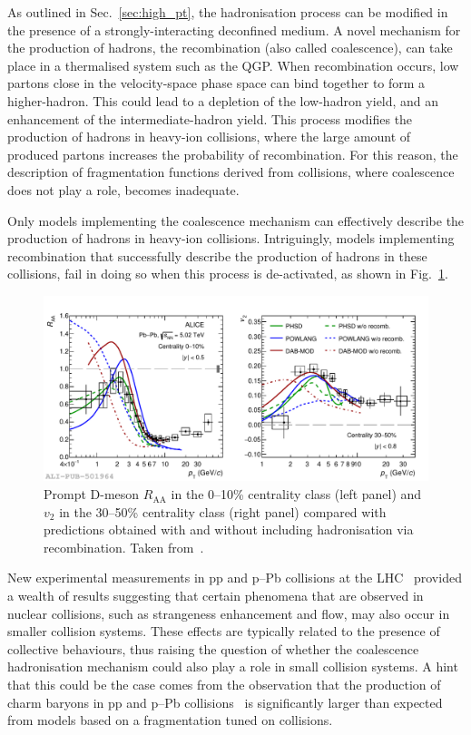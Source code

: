 As outlined in Sec.~\ref{sec:high_pt}, the hadronisation process can be modified in the presence of a strongly-interacting deconfined medium. A novel mechanism for the production of hadrons, the recombination (also called coalescence), can take place in a thermalised system such as the QGP. When recombination occurs, low \pt partons close in the velocity-space phase space can bind together to form a higher-\pt hadron. This could lead to a depletion of the low-\pt hadron yield, and an enhancement of the intermediate-\pt hadron yield. This process modifies the production of hadrons in heavy-ion collisions, where the large amount of produced partons increases the probability of recombination. For this reason, the description of fragmentation functions derived from \ee collisions, where coalescence does not play a role, becomes inadequate. 

Only models implementing the coalescence mechanism can effectively describe the production of hadrons in heavy-ion collisions. Intriguingly, models implementing recombination that successfully describe the production of hadrons in these collisions, fail in doing so when this process is de-activated, as shown in Fig.~\ref{fig:D_recombination}. 

\begin{figure}[htb]
  \centering
  \includegraphics[width=\linewidth]{Figures/Chapter 2/D_Raa010_V23050_FragCoal_3models_1.pdf}
  \caption{Prompt D-meson $R_\mathrm{AA}$ in the 0--10\% centrality class (left panel) and $v_2$ in the 30--50\% centrality class (right panel) compared with predictions obtained with and without including hadronisation via recombination. Taken from~\cite{ALICE:2021rxa}.}
  \label{fig:D_recombination}
\end{figure}

New experimental measurements in pp and p--Pb collisions at the LHC~\cite{ALICE:2016fzo,ALICE:2020wla,ALICE:2024ozd,ALICE:2020wfu,ALICE:2021bli,CMS:2015fgy} provided a wealth of results suggesting that certain phenomena that are observed in nuclear collisions, such as strangeness enhancement and flow, may also occur in smaller collision systems. These effects are typically related to the presence of collective behaviours, thus raising the question of whether the coalescence hadronisation mechanism could also play a role in small collision systems. A hint that this could be the case comes from the observation that the production of charm baryons in pp and p--Pb collisions~\cite{ALICE:2022exq,ALICE:2024ozd} is significantly larger than expected from models based on a fragmentation tuned on \ee collisions. 

